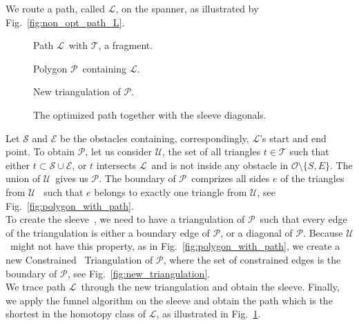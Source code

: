 \documentclass{llncs}
\newcommand{\cdt}{$\mathcal{T}$}
\newcommand{\unpath}{$\mathcal{L}$}
\newcommand{\triset}{$\mathcal{U}$}
\newcommand{\plg}{$\mathcal{P}$}
\begin{document}
{We route a path, called \unpath, on the spanner, as illustrated by Fig.~\ref{fig:non_opt_path_L}.
\begin{figure}[!tbp]
  \centering
  \begin{minipage}[b]{0.45\textwidth}
    
    \caption{Path \unpath~with \cdt, a fragment.}
    \label{fig:non_opt_path_L}
  \end{minipage}
  \hfill
  \begin{minipage}[b]{0.45\textwidth}
    
    \caption{Polygon \plg~containing \unpath.}
    \label{fig:polygon_with_path}
  \end{minipage}
  \vfill
  \begin{minipage}[b]{0.45\textwidth}
    
    \caption{New triangulation of \plg.}
    \label{fig:new_triangulation}
  \end{minipage}
  \hfill
  \begin{minipage}[b]{0.45\textwidth}
    
    \caption{The optimized path together with the sleeve diagonals.}
    \label{fig:optimized_path}
  \end{minipage}
\end{figure}
Let $\mathcal{S}$ and $\mathcal{E}$ be the obstacles containing, correspondingly, \unpath's start and end point.
To obtain \plg, let us consider \triset, the set of all triangles ${t} \in \mathcal{T}$ such that
either ${t} \subset \mathcal{S} \cup \mathcal{E}$, or $t$ intersects \unpath~and is not inside any obstacle in $\mathcal{O} \setminus \{S,E\}$.
The union of \triset~gives us \plg. The boundary of \plg~comprizes all sides $e$ of the triangles from \triset~ such that $e$ belongs to exactly one triangle from \triset, see Fig.~\ref{fig:polygon_with_path}. \\
To create the sleeve~\cite{chazelle1982theorem,hershberger1994computing}, we need to have a triangulation of \plg~such that every edge of the triangulation is either a boundary edge of \plg, or a diagonal of \plg. Because \triset~might not have this property, as in Fig.~\ref{fig:polygon_with_path}, we create a new Constrained \ Triangulation of \plg, where the set of constrained edges is the boundary of \plg, see Fig.~\ref{fig:new_triangulation}.\\
We trace path \unpath~through the new triangulation and obtain the sleeve. Finally, we apply the funnel algorithm on the sleeve and obtain the path which is the shortest in the homotopy class of \unpath, as illustrated in Fig.~\ref{fig:optimized_path}.\\
}
\end{document}
